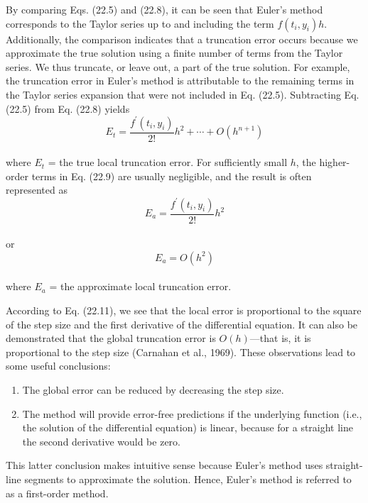 \documentclass[../main.tex]{subfiles}
\begin{document}
By comparing Eqs. (22.5) and (22.8), it can be seen that Euler's method corresponds to the Taylor series up to and including the term $f(t_{i}, y_{i})h$. Additionally, the comparison
indicates that a truncation error occurs because we approximate the true solution using a finite number of terms from the Taylor series. We thus truncate, or leave out, a part of the true
solution. For example, the truncation error in Euler's method is attributable to the remaining terms in the Taylor series expansion that were not included in Eq. (22.5). Subtracting
Eq. (22.5) from Eq. (22.8) yields\\
\begin{equation}
\tag{22.9}
E_{t} = \dfrac{ f^{'}( t_{i},y_{i} ) }{2!}h^2 + \cdots + O(h^{n+1})
\end{equation}\\
where $E_{t}$ = the true local truncation error. For sufficiently small $h$, the higher-order terms
in Eq. (22.9) are usually negligible, and the result is often represented as\\
\begin{equation}
\tag{22.10}
E_{a} = \dfrac{f^{'} ( t_{i}, y_{i} )}{2!} h^2
\end{equation}\\
or\\
\begin{equation}
\tag{22.11}
E_{a} = O(h^2)
\end{equation}\\
where $E_{a}$ = the approximate local truncation error.

According to Eq. (22.11), we see that the local error is proportional to the square of
the step size and the first derivative of the differential equation. It can also be demonstrated that the global truncation error is $O(h)$—that is, it is proportional to the step size (Carnahan et al., 1969). These observations lead to some useful conclusions:

\begin{enumerate}
\item The global error can be reduced by decreasing the step size.
\item The method will provide error-free predictions if the underlying function (i.e., the
solution of the differential equation) is linear, because for a straight line the second
derivative would be zero.
\end{enumerate}
This latter conclusion makes intuitive sense because Euler's method uses straight-line segments to approximate the solution. Hence, Euler's method is referred to as a first-order
method.
\end{document}
